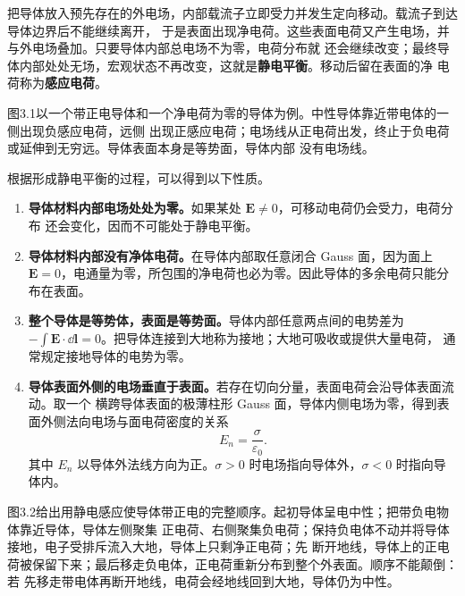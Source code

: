 把导体放入预先存在的外电场，内部载流子立即受力并发生定向移动。载流子到达导体边界后不能继续离开，
于是表面出现净电荷。这些表面电荷又产生电场，并与外电场叠加。只要导体内部总电场不为零，电荷分布就
还会继续改变；最终导体内部处处无场，宏观状态不再改变，这就是\textbf{静电平衡}。移动后留在表面的净
电荷称为\textbf{感应电荷}。

图3.1以一个带正电导体和一个净电荷为零的导体为例。中性导体靠近带电体的一侧出现负感应电荷，远侧
出现正感应电荷；电场线从正电荷出发，终止于负电荷或延伸到无穷远。导体表面本身是等势面，导体内部
没有电场线。

\conductorFieldFigure
{}

根据形成静电平衡的过程，可以得到以下性质。

\begin{enumerate}[label=\arabic*.]
  \item \textbf{导体材料内部电场处处为零。}如果某处 $\boldsymbol E\ne0$，可移动电荷仍会受力，电荷分布
  还会变化，因而不可能处于静电平衡。

  \item \textbf{导体材料内部没有净体电荷。}在导体内部取任意闭合 Gauss 面，因为面上
  $\boldsymbol E=0$，电通量为零，所包围的净电荷也必为零。因此导体的多余电荷只能分布在表面。

  \item \textbf{整个导体是等势体，表面是等势面。}导体内部任意两点间的电势差为
  $-\int\boldsymbol E\cdot\dd\boldsymbol l=0$。把导体连接到大地称为接地；大地可吸收或提供大量电荷，
  通常规定接地导体的电势为零。

  \item \textbf{导体表面外侧的电场垂直于表面。}若存在切向分量，表面电荷会沿导体表面流动。取一个
  横跨导体表面的极薄柱形 Gauss 面，导体内侧电场为零，得到表面外侧法向电场与面电荷密度的关系
  \begin{equation}
    \boxed{E_n=\frac{\sigma}{\varepsilon_0}}.
  \end{equation}
  其中 $E_n$ 以导体外法线方向为正。$\sigma>0$ 时电场指向导体外，$\sigma<0$ 时指向导体内。
\end{enumerate}

图3.2给出用静电感应使导体带正电的完整顺序。起初导体呈电中性；把带负电物体靠近导体，导体左侧聚集
正电荷、右侧聚集负电荷；保持负电体不动并将导体接地，电子受排斥流入大地，导体上只剩净正电荷；先
断开地线，导体上的正电荷被保留下来；最后移走负电体，正电荷重新分布到整个外表面。顺序不能颠倒：若
先移走带电体再断开地线，电荷会经地线回到大地，导体仍为中性。

